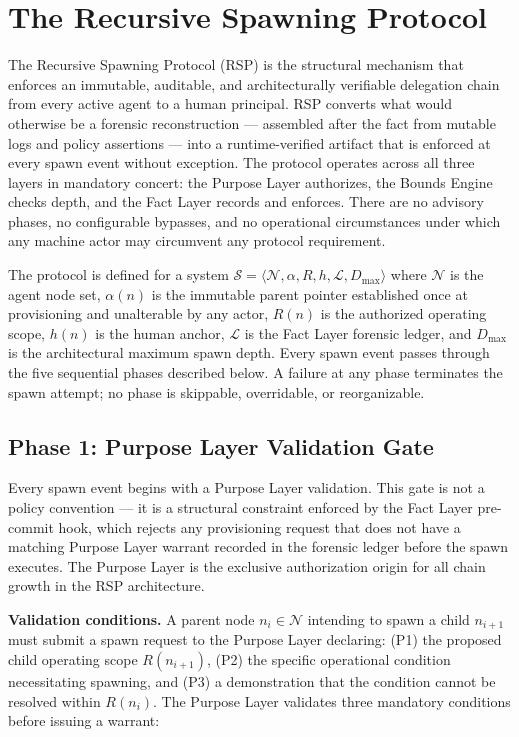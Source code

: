 \section{The Recursive Spawning Protocol}
\label{sec:rs-protocol}

The Recursive Spawning Protocol (RSP) is the structural mechanism that enforces an immutable, auditable, and architecturally verifiable delegation chain from every active agent to a human principal. RSP converts what would otherwise be a forensic reconstruction — assembled after the fact from mutable logs and policy assertions — into a runtime-verified artifact that is enforced at every spawn event without exception. The protocol operates across all three \bxthree{} layers in mandatory concert: the Purpose Layer authorizes, the Bounds Engine checks depth, and the Fact Layer records and enforces. There are no advisory phases, no configurable bypasses, and no operational circumstances under which any machine actor may circumvent any protocol requirement.

The protocol is defined for a system $\mathcal{S} = \langle \mathcal{N}, \alpha, R, h, \mathcal{L}, D_{\max} \rangle$ where $\mathcal{N}$ is the agent node set, $\alpha(n)$ is the immutable parent pointer established once at provisioning and unalterable by any actor, $R(n)$ is the authorized operating scope, $h(n)$ is the human anchor, $\mathcal{L}$ is the Fact Layer forensic ledger, and $D_{\max}$ is the architectural maximum spawn depth. Every spawn event passes through the five sequential phases described below. A failure at any phase terminates the spawn attempt; no phase is skippable, overridable, or reorganizable.

\subsection{Phase 1: Purpose Layer Validation Gate}
\label{sec:rs-phase1}

Every spawn event begins with a Purpose Layer validation. This gate is not a policy convention — it is a structural constraint enforced by the Fact Layer pre-commit hook, which rejects any provisioning request that does not have a matching Purpose Layer warrant recorded in the forensic ledger before the spawn executes. The Purpose Layer is the exclusive authorization origin for all chain growth in the RSP architecture.

\medskip
\noindent\textbf{Validation conditions.} A parent node $n_i \in \mathcal{N}$ intending to spawn a child $n_{i+1}$ must submit a spawn request to the Purpose Layer declaring: (P1) the proposed child operating scope $R(n_{i+1})$, (P2) the specific operational condition necessitating spawning, and (P3) a demonstration that the condition cannot be resolved within $R(n_i)$. The Purpose Layer validates three mandatory conditions before issuing a warrant:

